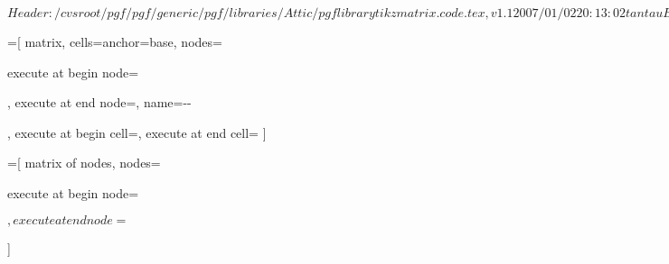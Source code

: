 %
%
%

\ProvidesFileRCS[v\pgfversion] $Header: /cvsroot/pgf/pgf/generic/pgf/libraries/Attic/pgflibrarytikzmatrix.code.tex,v 1.1 2007/01/02 20:13:02 tantau Exp $

=[%
   matrix,%
   cells={anchor=base},%
   nodes={%
     execute at begin node=\strut,%
     execute at end node=,
     name=\tikzmatrixname-\the\pgfmatrixcurrentrow-\the\pgfmatrixcurrentcolumn%
   },
   execute at begin cell=\tikz@lib@matrix@start@cell,%
   execute at end cell=\tikz@lib@matrix@end@cell%
]

\newif\iftikz@lib@matrix@plain

\def\tikz@lib@matrix@start@cell{\pgfutil@ifnextchar\let{\tikz@lib@matrix@check}{\tikz@lib@matrix@plainfalse\node\bgroup}}%

\def\tikz@lib@matrix@check#1{%
  \pgfutil@ifnextchar\tikz@signal@path{\tikz@lib@matrix@plaintrue\let}{\tikz@lib@matrix@plainfalse\node\bgroup\let}%
}
  
\def\tikz@lib@matrix@end@cell{%
  \iftikz@lib@matrix@plain%
  \else%
    \expandafter\egroup\expandafter;%
  \fi%
}

=[%
  matrix of nodes,
  nodes={%
   execute at begin node=\strut$,%
   execute at end node=$%
  }%
]


\endinput
